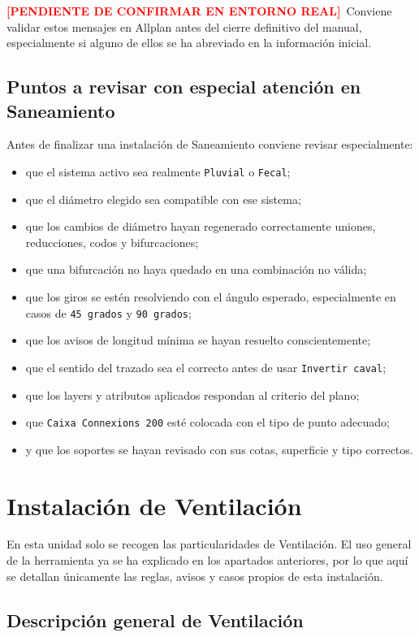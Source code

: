 \documentclass[12pt,a4paper]{article}
\newcommand{\pendingtag}{\textcolor{red}{\textbf{[PENDIENTE DE CONFIRMAR EN ENTORNO REAL]}}}
\begin{document}
\pendingtag\ Conviene validar estos mensajes en Allplan antes del cierre definitivo del manual, especialmente si alguno de ellos se ha abreviado en la información inicial.

\subsection{Puntos a revisar con especial atención en Saneamiento}

Antes de finalizar una instalación de Saneamiento conviene revisar especialmente:

\begin{itemize}
\item que el sistema activo sea realmente \texttt{Pluvial} o \texttt{Fecal};
\item que el diámetro elegido sea compatible con ese sistema;
\item que los cambios de diámetro hayan regenerado correctamente uniones, reducciones, codos y bifurcaciones;
\item que una bifurcación no haya quedado en una combinación no válida;
\item que los giros se estén resolviendo con el ángulo esperado, especialmente en casos de \texttt{45 grados} y \texttt{90 grados};
\item que los avisos de longitud mínima se hayan resuelto conscientemente;
\item que el sentido del trazado sea el correcto antes de usar \texttt{Invertir caval};
\item que los layers y atributos aplicados respondan al criterio del plano;
\item que \texttt{Caixa Connexions 200} esté colocada con el tipo de punto adecuado;
\item y que los soportes se hayan revisado con sus cotas, superficie y tipo correctos.
\end{itemize}

\section{Instalación de Ventilación}

En esta unidad solo se recogen las particularidades de Ventilación. El uso general de la herramienta ya se ha explicado en los apartados anteriores, por lo que aquí se detallan únicamente las reglas, avisos y casos propios de esta instalación.

\subsection{Descripción general de Ventilación}
\end{document}

